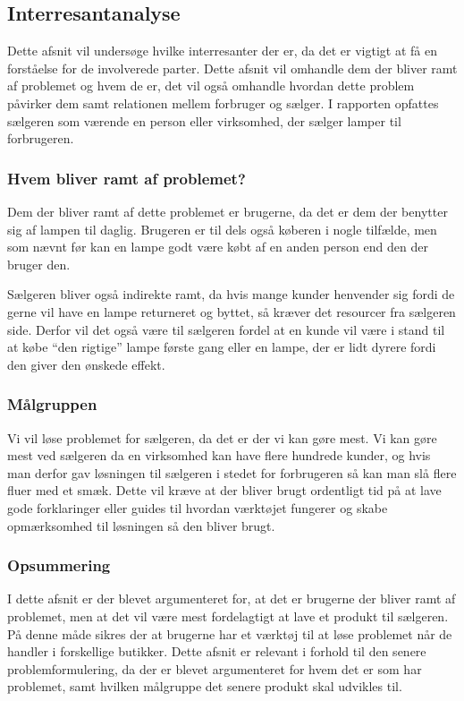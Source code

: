 \subsection{Interresantanalyse}

 Dette afsnit vil undersøge hvilke interresanter der er, da det er vigtigt at få en forståelse for de involverede parter. Dette afsnit vil omhandle dem der bliver ramt af problemet og hvem de er, det vil også omhandle hvordan dette problem påvirker dem samt relationen mellem forbruger og sælger. I rapporten opfattes sælgeren som værende en person eller virksomhed, der sælger lamper til forbrugeren. 

\subsubsection{Hvem bliver ramt af problemet?}
Dem der bliver ramt af dette problemet er brugerne, da det er dem der benytter sig af lampen til daglig. Brugeren er til dels også køberen i nogle tilfælde, men som nævnt før kan en lampe godt være købt af en anden person end den der bruger den.

Sælgeren bliver også indirekte ramt, da hvis mange kunder henvender sig fordi de gerne vil have en lampe returneret og byttet, så kræver det resourcer fra sælgeren side. Derfor vil det også være til sælgeren fordel at en kunde vil være i stand til at købe “den rigtige” lampe første gang eller en lampe, der er lidt dyrere fordi den giver den ønskede effekt.
 
\subsubsection{Målgruppen}
Vi vil løse problemet for sælgeren, da det er der vi kan gøre mest. Vi kan gøre mest ved sælgeren da en virksomhed kan have flere hundrede kunder, og hvis man derfor gav løsningen til sælgeren i stedet for forbrugeren så kan man slå flere fluer med et smæk. Dette vil kræve at der bliver brugt ordentligt tid på at lave gode forklaringer eller guides til hvordan værktøjet fungerer og skabe opmærksomhed til løsningen så den bliver brugt.
 
\subsubsection{Opsummering}
I dette afsnit er der blevet argumenteret for, at det er brugerne der bliver ramt af problemet, men at det vil være mest fordelagtigt at lave et produkt til sælgeren. På denne måde sikres der at brugerne har et værktøj til at løse problemet når de handler i forskellige butikker. \newline Dette afsnit er relevant i forhold til den senere problemformulering, da der er blevet argumenteret for hvem det er som har problemet, samt hvilken målgruppe det senere produkt skal udvikles til.
